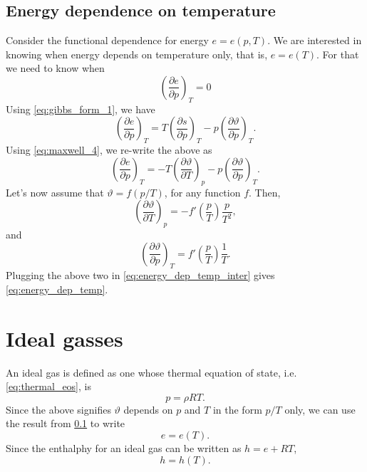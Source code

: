 \documentclass[oneside,a4paper,11pt]{report}
\begin{document}
\subsection{Energy dependence on temperature}
\label{sec:energy_dep_temp}
Consider the functional dependence for energy  $e=e(p,T)$. We are interested in knowing when energy depends on temperature only, that is, $e = e(T)$. For that we need to know when 
\begin{equation}
    \label{eq:energy_dep_temp}
    \left( \frac{\partial e}{\partial p} \right)_T = 0
\end{equation}
Using \cref{eq:gibbs_form_1}, we have
\begin{equation*}
    \left( \frac{\partial e}{\partial p} \right)_T = T \left( \frac{\partial s}{\partial p} \right)_T - p \left( \frac{\partial \vartheta}{\partial p} \right)_T.
\end{equation*}
Using \cref{eq:maxwell_4}, we re-write the above as
\begin{equation}
    \label{eq:energy_dep_temp_inter}
    \left( \frac{\partial e}{\partial p} \right)_T = -T \left( \frac{\partial \vartheta}{\partial T} \right)_p - p \left( \frac{\partial \vartheta}{\partial p} \right)_T.
\end{equation}
Let's now assume that $\vartheta = f(p/T)$, for any function $f$. Then,
\begin{equation}
    \left( \frac{\partial \vartheta}{\partial T} \right)_p = - f'\left( \frac{p}{T} \right) \frac{p}{T^2},
\end{equation}
and
\begin{equation}
    \left( \frac{\partial \vartheta}{\partial p} \right)_T = f'\left( \frac{p}{T} \right) \frac{1}{T}.
\end{equation}
Plugging the above two in \cref{eq:energy_dep_temp_inter} gives \cref{eq:energy_dep_temp}.

\section{Ideal gasses}
An ideal gas is defined as one whose thermal equation of state, i.e.\@ \cref{eq:thermal_eos}, is
\begin{equation}
    p = \rho R T.
\end{equation}
Since the above signifies $\vartheta$ depends on $p$ and $T$ in the form $p/T$ only, we can use the result from \cref{sec:energy_dep_temp}
to write 
\begin{equation*}
    e = e(T).
\end{equation*}
Since the enthalphy for an ideal gas can be written as $h = e + RT$,
\begin{equation*}
    h = h(T).
\end{equation*}
\end{document}
